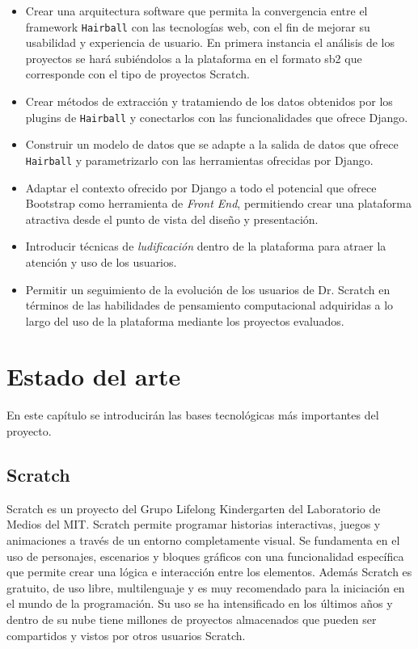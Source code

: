 \documentclass[a4paper, 12pt]{book}
\begin{document}
\begin{itemize}
  \item Crear una arquitectura software que permita la convergencia entre el framework 
	\texttt{Hairball} con las tecnologías web, con el fin de mejorar su usabilidad y 
	experiencia de usuario. En 	primera instancia el análisis de los proyectos se hará 
	subiéndolos a la plataforma en el formato sb2 que corresponde con el tipo de
	proyectos Scratch.
	\item Crear métodos de extracción y tratamiendo de los datos obtenidos por los
	plugins de \texttt{Hairball} y conectarlos con las funcionalidades que ofrece
	Django.
  \item Construir un modelo de datos que se adapte a la salida de datos que ofrece 
	\texttt{Hairball} y parametrizarlo con las herramientas ofrecidas por Django.
  \item Adaptar el contexto ofrecido por Django a todo el potencial que ofrece Bootstrap 
	como herramienta de \emph{Front End}, permitiendo crear una plataforma atractiva 
	desde el punto de vista del diseño y presentación.
  \item Introducir técnicas de \emph{ludificación} dentro de la plataforma para atraer 
	la atención y uso de los usuarios.
	\item Permitir un seguimiento de la evolución de los usuarios de Dr. Scratch en 
	términos de las habilidades de pensamiento computacional adquiridas a lo largo del 
	uso de la plataforma mediante los proyectos evaluados.
\end{itemize}



\cleardoublepage
\chapter{Estado del arte}

En este capítulo se introducirán las bases tecnológicas más importantes del proyecto.


\section{Scratch}
\label{sec:seccion2}
Scratch es un proyecto del Grupo Lifelong Kindergarten del Laboratorio de Medios del MIT.
Scratch permite programar historias interactivas, juegos y animaciones a través de un
entorno completamente visual. Se fundamenta en el uso de personajes, escenarios y bloques
gráficos con una funcionalidad específica que permite crear una lógica e interacción
entre los elementos. Además Scratch es gratuito, de uso libre, multilenguaje y es muy
recomendado para la iniciación en el mundo de la programación. Su uso se ha intensificado
en los últimos años y dentro de su nube tiene millones de proyectos almacenados que
pueden ser compartidos y vistos por otros usuarios Scratch.
\end{document}
